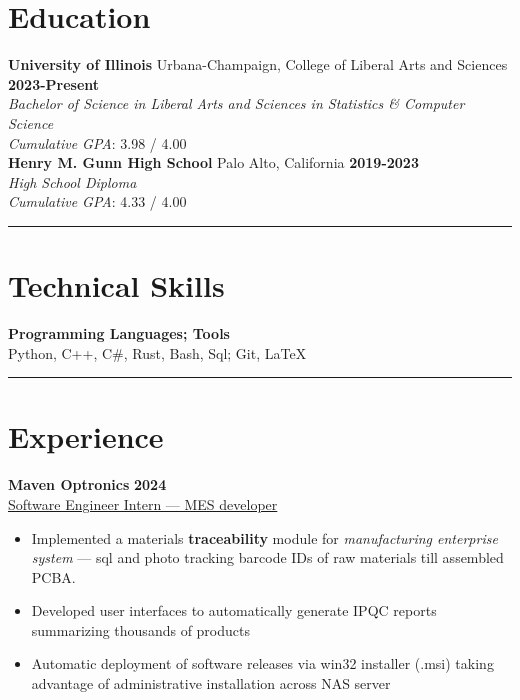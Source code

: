 \documentclass[11pt]{article}
\begin{document}

\section*{Education}

\textbf{University of Illinois} Urbana-Champaign, College of Liberal Arts and Sciences \hfill \textbf{2023-Present} \\
\emph{Bachelor of Science in Liberal Arts and Sciences in Statistics \& Computer Science} \\
\emph{Cumulative GPA}: 3.98 / 4.00 \\

\textbf{Henry M. Gunn High School} Palo Alto, California \hfill \textbf{2019-2023} \\
\emph{High School Diploma} \\
\emph{Cumulative GPA}: 4.33 / 4.00 \\

\vspace*{-5mm}
\rule{\textwidth}{0.1pt}
\vspace*{-10mm}

\section*{Technical Skills}
\textbf{Programming Languages; Tools} \\
Python, C++, C\#, Rust, Bash, Sql; Git, \LaTeX \\

\vspace*{-5mm}
\rule{\textwidth}{0.1pt}
\vspace*{-10mm}

\section*{Experience}

\textbf{Maven Optronics} \hfill \textbf{2024} \\
\underline{Software Engineer Intern --- MES developer}
\begin{itemize}
	\cramped
    \item Implemented a materials \textbf{traceability} module for \emph{manufacturing enterprise system} --- sql and photo tracking barcode IDs of raw materials till assembled PCBA.
    \item Developed user interfaces to automatically generate IPQC reports summarizing thousands of products
    \item Automatic deployment of software releases via win32 installer (.msi) taking advantage of administrative installation across NAS server
\end{itemize}
\end{document}
